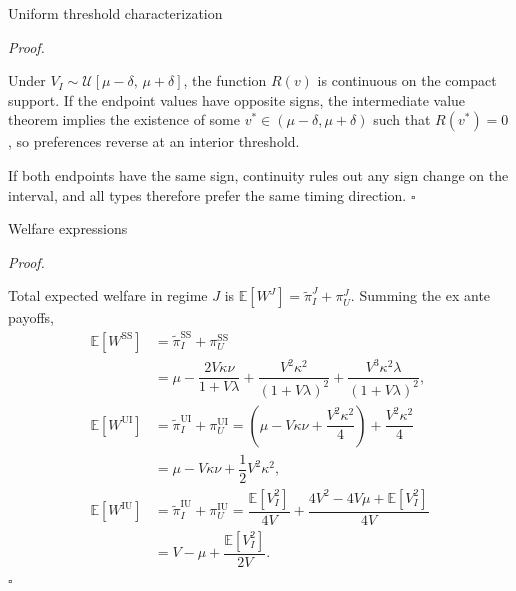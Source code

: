 \documentclass[10pt]{beamer}
\newcommand{\E}{\mathbb{E}}
\newcommand{\pt}{\widetilde{\pi}}
\newcommand{\rSS}{\mathrm{SS}}
\newcommand{\rUI}{\mathrm{UI}}
\newcommand{\rIU}{\mathrm{IU}}
\renewenvironment{proof}{%
  \par\smallskip\noindent\textit{Proof.}\hspace{0.6em}\ignorespaces
}{%
  \unskip\nobreak\hfill$\square$\par\smallskip
}
\begin{document}
\begin{frame}{Uniform threshold characterization}\label{prf:uniform}
  \begin{proof}
    Under $V_I \sim \mathcal{U}[\mu-\delta,\,\mu+\delta]$, the function
    $R(v)$ is continuous on the compact support. If the endpoint values
    have opposite signs, the intermediate value theorem implies the
    existence of some $v^{*} \in (\mu-\delta,\mu+\delta)$ such that
    $R(v^{*}) = 0$, so preferences reverse at an interior threshold.

    If both endpoints have the same sign, continuity rules out any sign
    change on the interval, and all types therefore prefer the same
    timing direction.
  \end{proof}
\end{frame}

\begin{frame}{Welfare expressions}\label{prf:welfare}
  \begin{proof}
    Total expected welfare in regime $J$ is
    $\E[W^{J}] = \pt_I^{J} + \pi_U^{J}$. Summing the ex ante payoffs,
    \begin{align*}
      \E\!\left[W^{\rSS}\right]
        &= \pt_I^{\rSS} + \pi_U^{\rSS} \\
        &= \mu - \dfrac{2V\kappa\nu}{1+V\lambda}
           + \dfrac{V^2\kappa^2}{\left(1+V\lambda\right)^2}
           + \dfrac{V^3\kappa^2\lambda}{\left(1+V\lambda\right)^2}, \\[6pt]
      \E\!\left[W^{\rUI}\right]
        &= \pt_I^{\rUI} + \pi_U^{\rUI}
         = \left( \mu - V\kappa\nu + \dfrac{V^2\kappa^2}{4} \right)
           + \dfrac{V^2\kappa^2}{4} \\
        &= \mu - V\kappa\nu + \dfrac{1}{2}V^2\kappa^2, \\[6pt]
      \E\!\left[W^{\rIU}\right]
        &= \pt_I^{\rIU} + \pi_U^{\rIU}
         = \dfrac{\E\!\left[V_I^2\right]}{4V}
           + \dfrac{4V^2 - 4V\mu + \E\!\left[V_I^2\right]}{4V} \\
        &= V - \mu + \dfrac{\E\!\left[V_I^2\right]}{2V}.
    \end{align*}
  \end{proof}
\end{frame}
\end{document}

